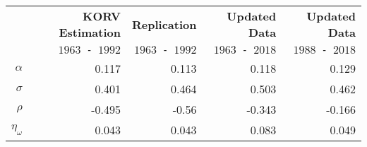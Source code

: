\begin{tabular}{rrrrr}
  \hline\hline
   & \textbf{KORV Estimation} & \textbf{Replication} & \textbf{Updated Data} & \textbf{Updated Data} \\
   & \texttt{$1963$ - $1992$} & \texttt{$1963$ - $1992$} & \texttt{$1963$ - $2018$} & \texttt{$1988$ - $2018$} \\\hline
  $\alpha$ & 0.117 & 0.113 & 0.118 & 0.129 \\
  $\sigma$ & 0.401 & 0.464 & 0.503 & 0.462 \\
  $\rho$ & -0.495 & -0.56 & -0.343 & -0.166 \\
  $\eta_\omega$ & 0.043 & 0.043 & 0.083 & 0.049 \\\hline\hline
\end{tabular}
